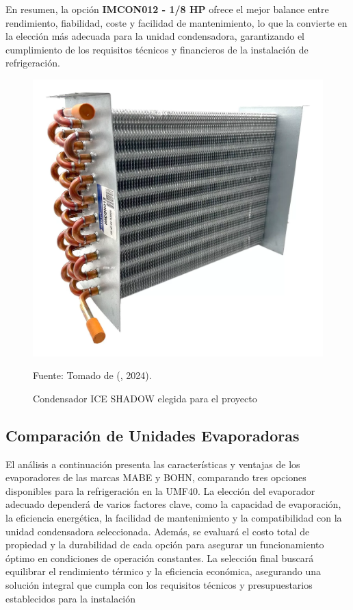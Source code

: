 En resumen, la opción \textbf{IMCON012 - 1/8 HP} ofrece el mejor balance entre rendimiento, fiabilidad, coste y facilidad de mantenimiento, lo que la convierte en la elección más adecuada para la unidad condensadora, garantizando el cumplimiento de los requisitos técnicos y financieros de la instalación de refrigeración.

\begin{figure}[H]
	\centering
	\includegraphics[width=0.45\linewidth]{figures/condensador}
	\caption{Condensador ICE SHADOW elegida para el proyecto}
	Fuente: Tomado de (\citeauthor{ml2024}, 2024).
	\label{fig:condensador}
\end{figure}

 
 
 
  \subsection{Comparación de Unidades Evaporadoras}
 
El análisis a continuación presenta las características y ventajas de los evaporadores de las marcas MABE y BOHN, comparando tres opciones disponibles para la refrigeración en la UMF40. La elección del evaporador adecuado dependerá de varios factores clave, como la capacidad de evaporación, la eficiencia energética, la facilidad de mantenimiento y la compatibilidad con la unidad condensadora seleccionada. Además, se evaluará el costo total de propiedad y la durabilidad de cada opción para asegurar un funcionamiento óptimo en condiciones de operación constantes. La selección final buscará equilibrar el rendimiento térmico y la eficiencia económica, asegurando una solución integral que cumpla con los requisitos técnicos y presupuestarios establecidos para la instalación  
 
